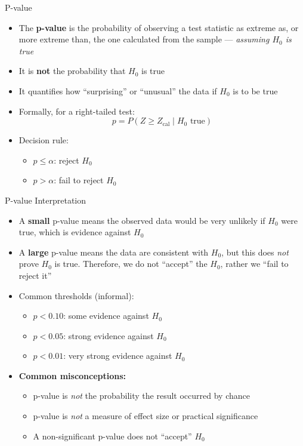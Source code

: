 \documentclass[12pt, aspectratio=169]{beamer}
\begin{document}
    \begin{frame}{P-value}
        \begin{itemize}
            \item The \textbf{p-value} is the probability of observing a test statistic
                as extreme as, or more extreme than, the one calculated from the sample ---
                \emph{assuming $H_0$ is true}
            \item It is \textbf{not} the probability that $H_0$ is true
            \item It quantifies how ``surprising'' or ``unusual'' the data if $H_0$ is to be true
            \item Formally, for a right-tailed test:
            \[
                p = P(Z \geqslant Z_{\text{cal}} \mid H_0 \text{ true})
            \]
            \item Decision rule:
            \begin{itemize}
                \item $p \leqslant \alpha$: reject $H_0$
                \item $p > \alpha$: fail to reject $H_0$
            \end{itemize}
        \end{itemize}
    \end{frame}


    \begin{frame}{P-value Interpretation}
        \begin{itemize}
            \item A \textbf{small} p-value means the observed data would be very
                unlikely if $H_0$ were true, which is evidence against $H_0$
            \item A \textbf{large} p-value means the data are consistent with $H_0$, but this does \emph{not} prove $H_0$ is true. Therefore, we do not ``accept'' the \(H_0\), rather we ``fail to reject it''
            \item Common thresholds (informal):
            \begin{itemize}
                \item $p < 0.10$: some evidence against $H_0$
                \item $p < 0.05$: strong evidence against $H_0$
                \item $p < 0.01$: very strong evidence against $H_0$
            \end{itemize}
            \item \textbf{Common misconceptions:}
            \begin{itemize}
                \item p-value is \emph{not} the probability the result occurred by chance
                \item p-value is \emph{not} a measure of effect size or practical significance
                \item A non-significant p-value does not ``accept'' $H_0$
            \end{itemize}
        \end{itemize}
    \end{frame}
\end{document}
